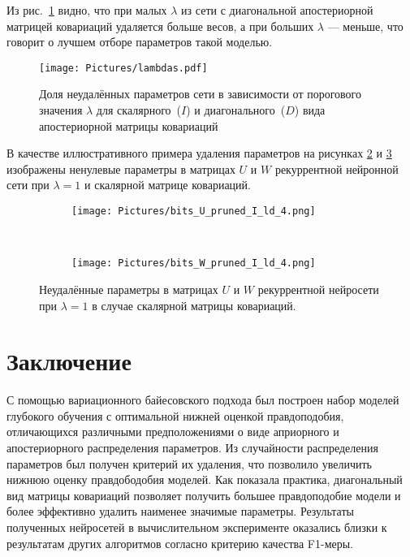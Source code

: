 \documentclass[12pt, fleqn, unicode]{article}
\begin{document}
Из рис.~\ref{lambdas} видно, что при малых $\lambda$ из сети с диагональной апостериорной матрицей ковариаций удаляется больше весов, а при больших $\lambda$ --- меньше, что говорит о лучшем отборе параметров такой моделью.
\begin{figure}[ht]
	\centering
	\texttt{[image: Pictures/lambdas.pdf]}
	\caption{Доля неудалённых параметров сети в зависимости от порогового значения $\lambda$ для скалярного~($I$) и диагонального~($D$) вида апостериорной матрицы ковариаций}
	\label{lambdas}
\end{figure}

В качестве иллюстративного примера удаления параметров на рисунках \ref{matrix_U} и \ref{matrix_W} изображены ненулевые параметры в матрицах $U$ и $W$ рекуррентной нейронной сети при $\lambda = 1$ и скалярной матрице ковариаций.

\begin{figure}
	\centering
	\begin{subfigure}[ht!]{0.33\textwidth}
		\texttt{[image: Pictures/bits\_U\_pruned\_I\_ld\_4.png]}
		\caption{}
		\label{matrix_U}
	\end{subfigure}
	~
	\begin{subfigure}[ht!]{0.33\textwidth}
		\texttt{[image: Pictures/bits\_W\_pruned\_I\_ld\_4.png]}
		\caption{}
		\label{matrix_W}
	\end{subfigure}
	\hspace{1mm}
	\caption{Неудалённые параметры в матрицах $U$ и $W$ рекуррентной нейросети при $\lambda=1$ в случае скалярной матрицы ковариаций.}
	\label{matrix_U_W}
\end{figure}

\newpage
\section{Заключение}
С помощью вариационного байесовского подхода был построен набор моделей глубокого обучения с оптимальной нижней оценкой правдоподобия, отличающихся различными предположениями о виде априорного и апостериорного распределения параметров. Из случайности распределения параметров был получен критерий их удаления, что позволило увеличить нижнюю оценку правдободобия моделей. Как показала практика, диагональный вид матрицы ковариаций позволяет получить большее правдоподобие модели и более эффективно удалить наименее значимые параметры.
Результаты полученных нейросетей в вычислительном эксперименте оказались близки к результатам других алгоритмов согласно критерию качества F1-меры.
\end{document}
